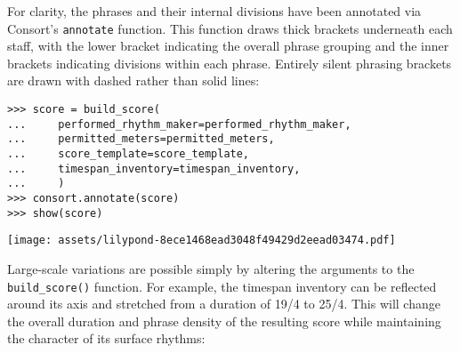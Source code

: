 \noindent For clarity, the phrases and their internal divisions have been
annotated via Consort's \texttt{annotate} function. This function draws thick
brackets underneath each staff, with the lower bracket indicating the overall
phrase grouping and the inner brackets indicating divisions within each phrase.
Entirely silent phrasing brackets are drawn with dashed rather than solid
lines:

\begin{comment}
<abjad>[stylesheet=../consort-small.ily]
score = build_score(
    performed_rhythm_maker=performed_rhythm_maker,
    permitted_meters=permitted_meters,
    score_template=score_template,
    timespan_inventory=timespan_inventory,
    )
consort.annotate(score)
show(score)
</abjad>
\end{comment}

\begin{singlespacing}
\vspace{-0.5\baselineskip}
\begin{lstlisting}
>>> score = build_score(
...     performed_rhythm_maker=performed_rhythm_maker,
...     permitted_meters=permitted_meters,
...     score_template=score_template,
...     timespan_inventory=timespan_inventory,
...     )
>>> consort.annotate(score)
>>> show(score)
\end{lstlisting}
\noindent\texttt{[image: assets/lilypond-8ece1468ead3048f49429d2eead03474.pdf]}
\end{singlespacing}

\noindent Large-scale variations are possible simply by altering the arguments
to the \texttt{build\_score()} function. For example, the timespan inventory
can be reflected around its axis and stretched from a duration of 19/4 to 25/4.
This will change the overall duration and phrase density of the resulting score
while maintaining the character of its surface rhythms:

\begin{comment}
<abjad>[stylesheet=../consort-small.ily]
multiplier = Duration(24, 4) / Duration(19, 4)
timespan_inventory = timespan_inventory.reflect()
timespan_inventory = timespan_inventory.stretch(multiplier)
timespan_inventory = timespan_inventory.round_offsets(Duration(1, 8))
show(timespan_inventory, key='voice_name')
score = build_score(
    performed_rhythm_maker=performed_rhythm_maker,
    permitted_meters=permitted_meters,
    score_template=score_template,
    timespan_inventory=timespan_inventory,
    )
consort.annotate(score)
show(score)
</abjad>
\end{comment}

